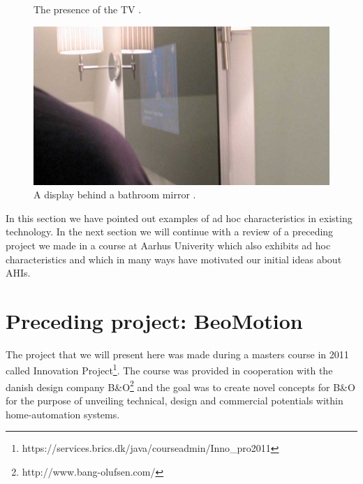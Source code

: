 \begin{figure}[h]
\begin{minipage}[b]{.44\textwidth}
		\caption{The presence of the TV \citep{lynggaard2012had}.}
		\label{fig:ch:adhoc:dubai-tv}
	\end{minipage}
\end{figure}

\begin{figure}[h]
	\centering
  		\includegraphics[width=.9\textwidth]{figures/adhoc/dubai-mirror}
	\caption{A display behind a bathroom mirror \citep{lynggaard2012had}.}
   \label{fig:ch:adhoc:dubai-mirror}
\end{figure}
In this section we have pointed out examples of ad hoc characteristics in existing technology.
In the next section we will continue with a review of a preceding project we made in a course at Aarhus Univerity which also exhibits ad hoc characteristics and which in many ways have motivated our initial ideas about AHIs.

\section{Preceding project: BeoMotion}

The project that we will present here was made during a masters course in 2011 called Innovation Project\footnote{https://services.brics.dk/java/courseadmin/Inno\_pro2011}.
The course was provided in cooperation with the danish design company B\&O\footnote{http://www.bang-olufsen.com/} and the goal was to create novel concepts for B\&O for the purpose of unveiling technical, design and commercial potentials within home-automation systems.

